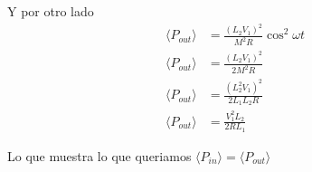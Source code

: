 \documentclass{report}
\begin{document}
Y por otro lado
\begin{align*}
	\langle P_{out}\rangle &= \frac{(L_2 V_1)^2}{M^2 R}\cos^2\omega t\\
	\langle P_{out}\rangle &= \frac{(L_2 V_1)^2}{2M^2 R}\\
	\langle P_{out}\rangle &= \frac{(L_2^2 V_1)^2}{2L_1L_2 R}\\
	\langle P_{out}\rangle &= \frac{V_1^2L_2}{2RL_1}
\end{align*}

Lo que muestra lo que queriamos $\langle P_{in} \rangle = \langle P_{out} \rangle$
\end{document}
